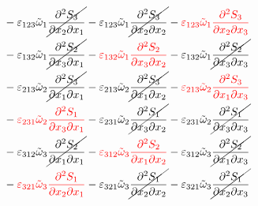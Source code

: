 \begin{equation}
	\begin{split}
&		-\varepsilon_{123}\tilde{\omega}_{1}\cancel{\pdv{S_{3}}{x_{2}}{x_{1}}}
		-\varepsilon_{123}\tilde{\omega}_{1}\cancel{\pdv{S_{3}}{x_{2}}{x_{2}}}
		-{\color{red}\varepsilon_{123}\tilde{\omega}_{1}\pdv{S_{3}}{x_{2}}{x_{3}}}\\
&		-\varepsilon_{132}\tilde{\omega}_{1}\cancel{\pdv{S_{2}}{x_{3}}{x_{1}}}
		-{\color{red}\varepsilon_{132}\tilde{\omega}_{1}\pdv{S_{2}}{x_{3}}{x_{2}}}
		-\varepsilon_{132}\tilde{\omega}_{1}\cancel{\pdv{S_{2}}{x_{3}}{x_{3}}}\\
&		-\varepsilon_{213}\tilde{\omega}_{2}\cancel{\pdv{S_{3}}{x_{1}}{x_{1}}}
		-\varepsilon_{213}\tilde{\omega}_{2}\cancel{\pdv{S_{3}}{x_{1}}{x_{2}}}
		-{\color{red}\varepsilon_{213}\tilde{\omega}_{2}\pdv{S_{3}}{x_{1}}{x_{3}}}\\
&		-{\color{red}\varepsilon_{231}\tilde{\omega}_{2}\pdv{S_{1}}{x_{3}}{x_{1}}}
		-\varepsilon_{231}\tilde{\omega}_{2}\cancel{\pdv{S_{1}}{x_{3}}{x_{2}}}
		-\varepsilon_{231}\tilde{\omega}_{2}\cancel{\pdv{S_{1}}{x_{3}}{x_{3}}}\\
&		-\varepsilon_{312}\tilde{\omega}_{3}\cancel{\pdv{S_{2}}{x_{1}}{x_{1}}}
		-{\color{red}\varepsilon_{312}\tilde{\omega}_{3}\pdv{S_{2}}{x_{1}}{x_{2}}}
		-\varepsilon_{312}\tilde{\omega}_{3}\cancel{\pdv{S_{2}}{x_{1}}{x_{3}}}\\
&		-{\color{red}\varepsilon_{321}\tilde{\omega}_{3}\pdv{S_{1}}{x_{2}}{x_{1}}}
		-\varepsilon_{321}\tilde{\omega}_{3}\cancel{\pdv{S_{1}}{x_{2}}{x_{2}}}
		-\varepsilon_{321}\tilde{\omega}_{3}\cancel{\pdv{S_{1}}{x_{2}}{x_{3}}}\\
	\end{split}
\end{equation}
